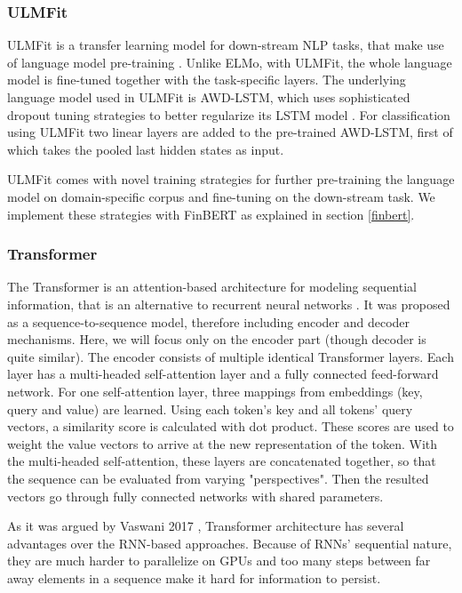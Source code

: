 \documentclass[../main.tex]{subfiles}
\begin{document}
 \subsubsection{ULMFit} \label{ulmfit}
 ULMFit is a transfer learning model for down-stream NLP tasks, that make use of language model pre-training \cite{Howard2018}. Unlike ELMo, with ULMFit, the whole language model is fine-tuned together with the task-specific layers. The underlying language model used in ULMFit is AWD-LSTM, which uses sophisticated dropout tuning strategies to better regularize its LSTM model \cite{DBLP:journals/corr/abs-1708-02182}. For classification using ULMFit two linear layers are added to the pre-trained AWD-LSTM, first of which takes the pooled last hidden states as input. 
 
ULMFit comes with novel training strategies for further pre-training the language model on domain-specific corpus and fine-tuning on the down-stream task. We implement these strategies with FinBERT as explained in section \ref{finbert}.
 
 \subsubsection{Transformer}
 The Transformer is an attention-based architecture for modeling sequential information, that is an alternative to recurrent neural networks \cite{Vaswani2017}. It was proposed as a sequence-to-sequence model, therefore including encoder and decoder mechanisms. Here, we will focus only on the encoder part (though decoder is quite similar). The encoder consists of multiple identical Transformer layers. Each layer has a multi-headed self-attention layer and a fully connected feed-forward network. For one self-attention layer, three mappings from embeddings (key, query and value) are learned. Using each token's key and all tokens' query vectors, a similarity score is calculated with dot product. These scores are used to weight the value vectors to arrive at the new representation of the token. With the multi-headed self-attention, these layers are concatenated together, so that the sequence can be evaluated from varying "perspectives". Then the resulted vectors go through fully connected networks with shared parameters. 
 
 As it was argued by Vaswani 2017 \cite{Vaswani2017}, Transformer architecture has several advantages over the RNN-based approaches. Because of RNNs' sequential nature, they are much harder to parallelize on GPUs and too many steps between far away elements in a sequence make it hard for information to persist.
 
\end{document}
